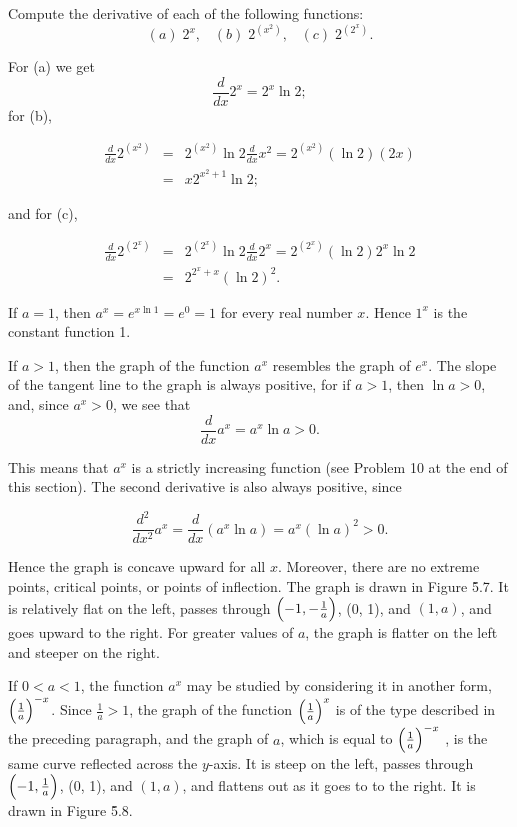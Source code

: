 \begin{example}
Compute the derivative of each of the following functions:
$$
(a)\; 2^x, \;\;\;(b)\; 2^{(x^2)}, \;\;\;(c)\; 2^{(2^x)}.
$$

\noindent For (a) we get
$$
\frac{d}{dx} 2^{x}  = 2^{x} \ln 2; 
$$
\noindent for (b),

\begin{eqnarray*}
\frac{d}{dx} 2^{(x^2)} 
&=& 2^{(x^2)} \ln 2 \frac{d}{dx} x^2 = 2^{(x^2)} (\ln 2) (2x) \\
&=& x 2^{x^{2} + 1} \ln 2;
\end{eqnarray*}

\noindent and for (c), 

\begin{eqnarray*}
\frac{d}{dx} 2^{(2^x)} 
&=& 2^{(2^{x})} \ln 2 \frac{d}{dx} 2^{x} = 2^{(2^{x})} (\ln 2) 2^{x} \ln 2 \\
&=& 2^{2^{x} +x} (\ln 2)^2.
\end{eqnarray*}
\end{example}

If $a = 1$, then $a^{x} = e^{x \ln 1} = e^{0} = 1$ for every real number $x$. Hence $1^{x}$ is the constant function 1.

If $a > 1$, then the graph of the function $a^{x}$ resembles the graph of $e^{x}$. The slope of the tangent line to the graph is always positive, for if $a > 1$, then $\ln a > 0$, and, since $a^{x} > 0$, we see that
$$
\frac{d}{dx} a^x = a^{x} \ln a > 0.
$$

This means that $a^x$ is a strictly increasing function (see Problem 10 at the end of this section). The second derivative is also always positive, since

$$
\frac{d^2}{dx^2} a^x = \frac{d}{dx} (a^{x} \ln a) = a^{x}(\ln a)^2 > 0.
$$

\noindent Hence the graph is concave upward for all $x$. Moreover, there are no extreme points, critical points, or points of inflection. The graph is drawn in Figure \f{5.7}. It is relatively flat on the left, passes through $\Bigl( -1, -\frac{1}{a} \Bigr)$, (0, 1), and $(1, a)$, and goes upward to the right. For greater values of $a$, the graph is flatter on the left and steeper on the right.



If $0 < a < 1$, the function $a^x$ may be studied by considering it in another form, $\Bigl( \frac{1}{a} \Bigr)^{-x}$. Since $\frac{1}{a} > 1$, the graph of the function $\Bigl( \frac{1}{a} \Bigr)^{x}$ is of the type described in the preceding
paragraph, and the graph of $a$, which is equal to $\Bigl( \frac{1}{a} \Bigr)^{-x}$ , is the same curve reflected across the $y$-axis. It is steep on the left, passes through $\Bigl( -1, \frac{1}{a} \Bigr)$, (0, 1), and $(1, a)$, and flattens out as it goes to to the right. It is drawn in Figure \f{5.8}.

